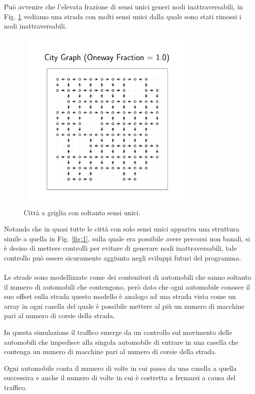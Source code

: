 \documentclass[main.tex]{subfiles}
\begin{document}
Può avvenire che l'elevata frazione di sensi unici generi nodi inattraversabili, in Fig. \ref{fig:2} vediamo una strada con molti sensi unici dalla
quale sono stati rimossi i nodi inattraversabili.

\begin{figure}[H]
    \centering
    \includegraphics[width=9cm, height=9cm]{city30.png}
    \caption{Città a griglia con soltanto sensi unici.}
    \label{fig:2}
\end{figure}

Notando che in quasi tutte le città con solo sensi unici appariva una struttura simile a quella in Fig. \ref{fig:1}, sulla quale era possibile avere 
percorsi non banali, si è deciso di mettere controlli per evitare di generare nodi inattraversabili, tale controllo può essere sicuramente aggiunto
negli sviluppi futuri del programma.\\
\hfill \\
Le strade sono modellizzate come dei contenitori di automobili che sanno soltanto il numero di automobili che contengono, però dato che ogni automobile conosce il suo offset sulla strada
questo modello è analogo ad una strada vista come un array in ogni casella del quale è possibile mettere al più un numero di macchine pari al numero di corsie della strada.

In questa simulazione il traffico emerge da un controllo sul movimento delle automobili che impedisce
alla singola automobile di entrare in una casella che contenga un numero di macchine pari al numero di corsie della strada.

Ogni automobile conta il numero di volte in cui passa da una casella a quella successiva e anche il numero di volte in cui
è costretta a fermarsi a causa del traffico.
\end{document}
